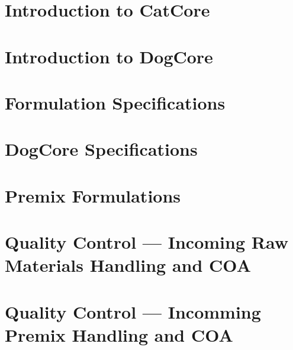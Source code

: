 \documentclass[11pt,oneside]{book}
\begin{document}
\chapter{Introduction to CatCore}



\chapter{Introduction to DogCore}


\pagestyle{headings}

\chapter{Formulation Specifications}

\chapter{DogCore Specifications}

\chapter{Premix Formulations}

\newpage

\newpage



\newpage



\chapter{Quality Control --- Incoming Raw Materials Handling and COA}



\chapter{Quality Control --- Incomming Premix Handling and COA}

\newpage


\newpage
% 
% 
\newpage

\newpage

\end{document}
